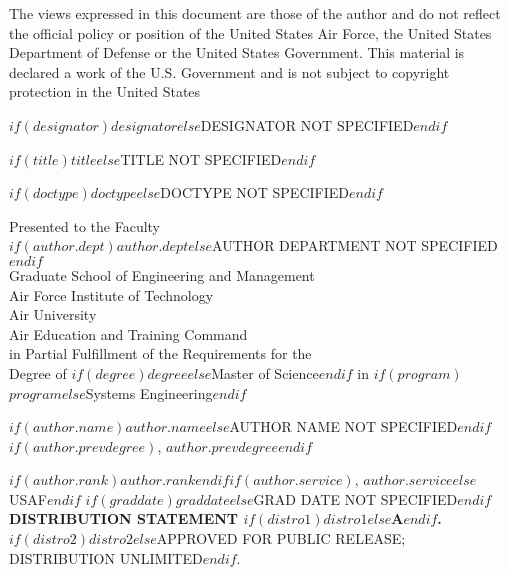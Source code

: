\documentclass[12pt,letterpaper,toc=flat,oneside]{report}
\begin{document}
	\thispagestyle{empty}
	\singlespacing
	\null	
	\vfill 
	\noindent The views expressed in this document are those of the
author and do not reflect the official policy or position of the
United States Air Force, the United States Department of Defense or
the United States Government.  This material is declared a work of the
U.S. Government and is not subject to copyright protection in the
United States
	\vfill 
	\doublespacing
	\newpage
	\pagestyle{plain}
    \begin{titlepage}
	\thispagestyle{empty}
	\noindent $if(designator)$$designator$$else$DESIGNATOR NOT SPECIFIED$endif$  
	\vfill
	\begin{center}
	    \MakeUppercase{$if(title)$$title$$else$TITLE NOT SPECIFIED$endif$}\par
	    \vskip 1cm
	    \MakeUppercase{$if(doctype)$$doctype$$else$DOCTYPE NOT SPECIFIED$endif$}\par
	    \vskip 1cm
	    Presented to the Faculty\\
	    $if(author.dept)$$author.dept$$else$AUTHOR DEPARTMENT NOT SPECIFIED$endif$\\
	    Graduate School of Engineering and Management~\\
	    Air Force Institute of Technology~\\
	    Air University~\\
	    Air Education and Training Command~\\
	    in Partial Fulfillment of the Requirements for the~\\
	    Degree of $if(degree)$$degree$$else$Master of Science$endif$ in $if(program)$$program$$else$Systems Engineering$endif$\\
	    \vskip 1cm
	    {$if(author.name)$$author.name$$else$AUTHOR NAME NOT SPECIFIED$endif$$if(author.prevdegree)$, $author.prevdegree$$endif$\par}
	    {$if(author.rank)$$author.rank$$endif$$if(author.service)$, \MakeUppercase{$author.service$}$else$USAF$endif$}
	    \vskip 1cm
	    $if(graddate)$$graddate$$else$GRAD DATE NOT SPECIFIED$endif$
	    \vskip 1cm
	    \MakeUppercase{\textbf{distribution statement $if(distro1)$$distro1$$else$A$endif$.}}\\[-8pt]
	    \MakeUppercase{$if(distro2)$$distro2$$else$approved for public release; distribution unlimited$endif$.}
	    \vfill
	\end{center}
	\newpage 
	\pagestyle{plain}
    \end{titlepage}
\end{document}
